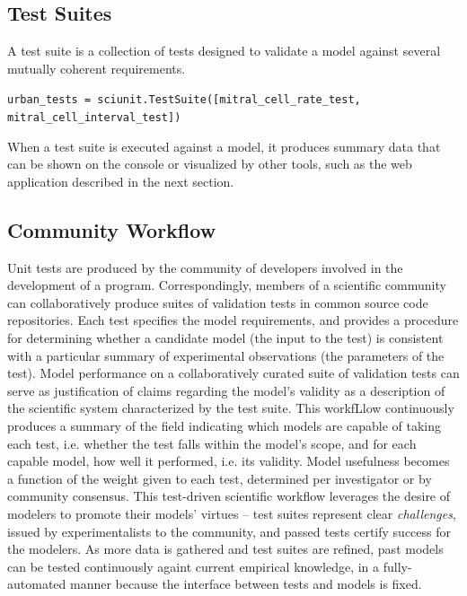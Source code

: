 \documentclass[11pt,letterpaper]{article}
\begin{document}
\subsection{Test Suites}
A test suite is a collection of tests designed to validate a model against several mutually coherent requirements.

\verb|urban_tests = sciunit.TestSuite([mitral_cell_rate_test, mitral_cell_interval_test])|

When a test suite is executed against a model, it produces summary data that can be shown on the console or visualized by other tools, such as the web application described in the next section.

\subsection{Community Workflow}
Unit tests are produced by the community of developers involved in the development of a program. Correspondingly, members of a scientific community can collaboratively produce suites of validation tests in common source code repositories. Each test specifies the model requirements, and provides a procedure for determining whether a candidate model (the input to the test) is consistent with a particular summary of experimental observations (the parameters of the test). Model performance on a collaboratively curated suite of validation tests can serve as justification of claims regarding the model's validity as a description of the scientific system characterized by the test suite. This workfLlow continuously produces a summary of the field indicating which models are capable of taking each test, i.e. whether the test falls within the model's scope, and for each capable model, how well it performed, i.e. its validity.  Model usefulness becomes a function of the weight given to each test, determined per investigator or by community consensus. This test-driven scientific workflow leverages the desire of modelers to promote their models' virtues -- test suites represent clear \emph{challenges}, issued by experimentalists to the community, and passed tests certify success for the modelers. As more data is gathered and test suites are refined, past models can be tested continuously againt current empirical knowledge, in a fully-automated manner because the interface between tests and models is fixed.  
\end{document}
